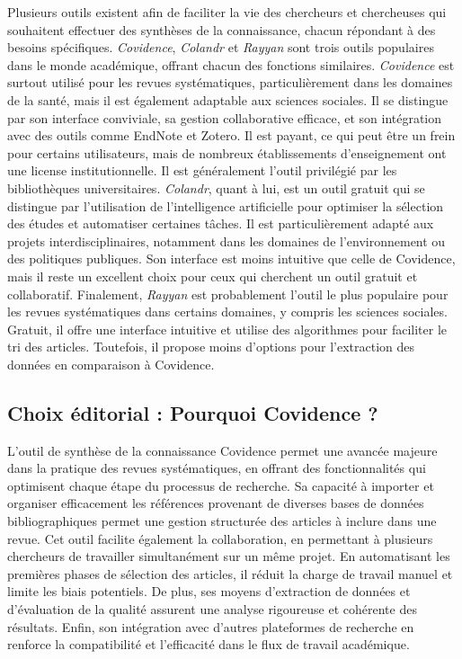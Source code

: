 \documentclass[
  letterpaper,
  DIV=11,
  numbers=noendperiod]{scrreprt}
\begin{document}
Plusieurs outils existent afin de faciliter la vie des chercheurs et
chercheuses qui souhaitent effectuer des synthèses de la connaissance,
chacun répondant à des besoins spécifiques. \emph{Covidence},
\emph{Colandr} et \emph{Rayyan} sont trois outils populaires dans le
monde académique, offrant chacun des fonctions similaires.
\emph{Covidence} est surtout utilisé pour les revues systématiques,
particulièrement dans les domaines de la santé, mais il est également
adaptable aux sciences sociales. Il se distingue par son interface
conviviale, sa gestion collaborative efficace, et son intégration avec
des outils comme EndNote et Zotero. Il est payant, ce qui peut être un
frein pour certains utilisateurs, mais de nombreux établissements
d'enseignement ont une license institutionnelle. Il est généralement
l'outil privilégié par les bibliothèques universitaires. \emph{Colandr},
quant à lui, est un outil gratuit qui se distingue par l'utilisation de
l'intelligence artificielle pour optimiser la sélection des études et
automatiser certaines tâches. Il est particulièrement adapté aux projets
interdisciplinaires, notamment dans les domaines de l'environnement ou
des politiques publiques. Son interface est moins intuitive que celle de
Covidence, mais il reste un excellent choix pour ceux qui cherchent un
outil gratuit et collaboratif. Finalement, \emph{Rayyan} est
probablement l'outil le plus populaire pour les revues systématiques
dans certains domaines, y compris les sciences sociales. Gratuit, il
offre une interface intuitive et utilise des algorithmes pour faciliter
le tri des articles. Toutefois, il propose moins d'options pour
l'extraction des données en comparaison à Covidence.

\subsection{Choix éditorial : Pourquoi Covidence
?}\label{choix-uxe9ditorial-pourquoi-covidence}

L'outil de synthèse de la connaissance Covidence permet une avancée
majeure dans la pratique des revues systématiques, en offrant des
fonctionnalités qui optimisent chaque étape du processus de recherche.
Sa capacité à importer et organiser efficacement les références
provenant de diverses bases de données bibliographiques permet une
gestion structurée des articles à inclure dans une revue. Cet outil
facilite également la collaboration, en permettant à plusieurs
chercheurs de travailler simultanément sur un même projet. En
automatisant les premières phases de sélection des articles, il réduit
la charge de travail manuel et limite les biais potentiels. De plus, ses
moyens d'extraction de données et d'évaluation de la qualité assurent
une analyse rigoureuse et cohérente des résultats. Enfin, son
intégration avec d'autres plateformes de recherche en renforce la
compatibilité et l'efficacité dans le flux de travail académique.
\end{document}
